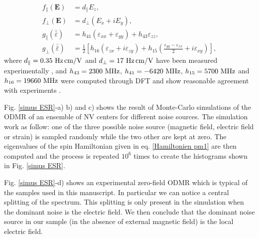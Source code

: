 \documentclass[a4paper,11pt]{report}
\begin{document}
\begin{align}
f_\parallel(\mathbf{E})&=d_\parallel E_z, \\
f_\perp(\mathbf{E})&=d_\perp ( E_x + i E_y), \\
g_\parallel(\bar{\bar{\varepsilon}})&= h_{41}(\varepsilon_{xx}+\varepsilon_{yy})+h_{43} \varepsilon_{zz}, \\
g_\perp(\bar{\bar{\varepsilon}}) &= \frac{1}{2} \left[ h_{16}(\varepsilon_{zx}+i \varepsilon_{zy}) + h_{15}\left(\frac{\varepsilon_{yy}-\varepsilon_{xx}}{2}+i\varepsilon_{xy}\right) \right],
\end{align}
where $d_\parallel=0.35 \ \rm{Hz\, cm/V}$ and $d_\perp=17\ \rm{Hz\, cm/V}$ have been measured experimentally \citep{van1990electric}, and $h_{43}=2300\ \rm{MHz}$, $h_{41}=-6420\ \rm{MHz}$, $h_{15}=5700\ \rm{MHz}$ and $h_{16}=19660\ \rm{MHz}$ were computed through DFT \citep{udvarhelyi2018spin} and show reasonable agreement with experiments \citep{barson2017nanomechanical}.

%

Fig. \ref{simus ESR}-a) b) and c) shows the result of Monte-Carlo simulations of the ODMR of an ensemble of NV centers for different noise sources. The simulation work as follow: one of the three possible noise source (magnetic field, electric field or strain) is sampled randomly while the two other are kept at zero. The eigenvalues of the spin Hamiltonian given in eq. \ref{Hamiltonien pm1} are then computed and the process is repeated $10^6$ times to create the histograms shown in Fig. \ref{simus ESR}.

Fig. \ref{simus ESR}-d) shows an experimental zero-field ODMR which is typical of the samples used in this manuscript. In particular we can notice a central splitting of the spectrum. This splitting is only present in the simulation when the dominant noise is the electric field. We then conclude that the dominant noise source in our sample (in the absence of external magnetic field) is the local electric field.
\end{document}
